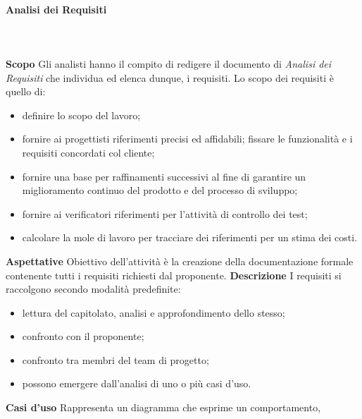 		\paragraph{Analisi dei Requisiti} \mbox{}\\ \mbox{}\\
			\textbf{Scopo} \newline \newline
			Gli analisti hanno il compito di redigere il documento di
			\textit{Analisi dei Requisiti} che individua ed elenca dunque, i requisiti.
			Lo scopo dei requisiti è quello di:
			\begin{itemize}
				\item definire lo scopo del lavoro;
				\item fornire ai progettisti riferimenti precisi ed affidabili;
				fissare le funzionalità e i requisiti concordati col cliente;
				\item fornire  una  base  per  raffinamenti  successivi  al  fine  di  garantire  un miglioramento continuo del prodotto e del processo di sviluppo;
				\item fornire ai verificatori riferimenti per l'attività di controllo dei test;
				\item calcolare la mole di lavoro per tracciare dei riferimenti per un stima dei costi.
			\end{itemize}
			\textbf{Aspettative} \newline \newline
			Obiettivo dell'attività è la creazione della documentazione formale contenente tutti i
			requisiti richiesti dal proponente. \newline \newline
			\textbf{Descrizione} \newline \newline
			I requisiti si raccolgono secondo modalità predefinite:
			\begin{itemize}
				\item lettura del capitolato\glo, analisi e approfondimento dello stesso;
				\item confronto con il proponente;
				\item confronto tra membri del team di progetto;
				\item possono emergere dall'analisi di uno o più casi d'uso.
			\end{itemize}
			\textbf{Casi d'uso} \newline \newline
			Rappresenta un diagramma che esprime un comportamento,
